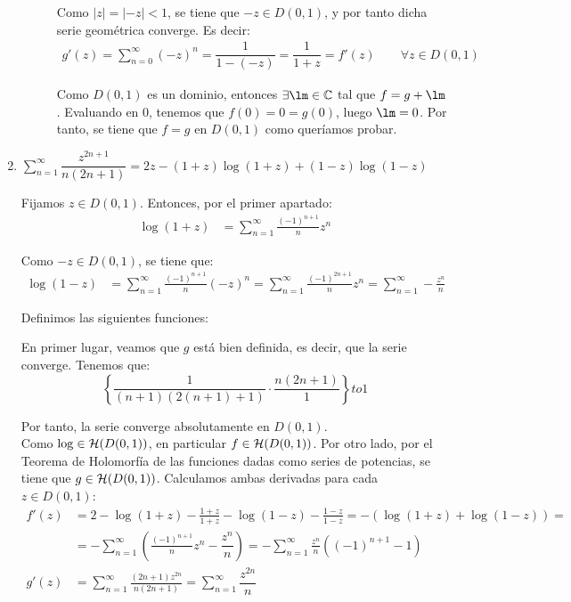 \begin{ejercicio}
\begin{enumerate}
\begin{description}
            Como $|z|=|-z|<1$, se tiene que $-z\in D(0,1)$, y por tanto dicha serie geométrica converge. Es decir:
            \begin{align*}
                g'(z) = \sum_{n=0}^\infty (-z)^{n}
                = \dfrac{1}{1-(-z)} = \dfrac{1}{1+z} = f'(z)\qquad \forall z\in D(0,1)
            \end{align*}

            Como $D(0,1)$ es un dominio, entonces $\exists \lm\in \bb{C}$ tal que $f=g+\lm$. Evaluando en $0$, tenemos que $f(0)=0=g(0)$, luego $\lm=0$. Por tanto, se tiene que $f=g$ en $D(0,1)$ como queríamos probar.
        \end{description}
        \item $\sum\limits_{n= 1}^\infty \dfrac{z^{2n+1}}{n(2n+1)} = 2z - (1+z)\log(1+z) + (1-z)\log(1-z)$
            
        Fijamos $z\in D(0,1)$. Entonces, por el primer apartado:
        \begin{align*}
            \log(1+z) &= \sum_{n=1}^\infty \frac{(-1)^{n+1}}{n}z^n
        \end{align*}

        Como $-z\in D(0,1)$, se tiene que:
        \begin{align*}
            \log(1-z) &= \sum_{n=1}^\infty \frac{(-1)^{n+1}}{n}(-z)^n = \sum_{n=1}^\infty \frac{(-1)^{2n+1}}{n}z^n
            = \sum_{n=1}^\infty -\frac{z^n}{n}
        \end{align*}

        Definimos las siguientes funciones:

        En primer lugar, veamos que $g$ está bien definida, es decir, que la serie converge. Tenemos que:
        \begin{equation*}
            \left\{\dfrac{1}{(n+1)(2(n+1)+1)}\cdot \dfrac{n(2n+1)}{1}\right\}to 1
        \end{equation*}

        Por tanto, la serie converge absolutamente en $D(0,1)$.\\

        Como $\log\in \mathcal{H}(D(0,1))$, en particular $f\in \mathcal{H}(D(0,1))$. Por otro lado, por el Teorema de Holomorfía de las funciones dadas como series de potencias, se tiene que $g\in \mathcal{H}(D(0,1))$. Calculamos ambas derivadas para cada $z\in D(0,1)$:
        \begin{align*}
            f'(z) &= 2 - \log(1+z) - \frac{1+z}{1+z} - \log(1-z) - \frac{1-z}{1-z} = -\left(\log(1+z) + \log(1-z)\right)
            =\\&= -\sum_{n=1}^\infty \left(\frac{(-1)^{n+1}}{n}z^n - \dfrac{z^n}{n}\right) = -\sum_{n=1}^\infty \frac{z^n}{n}\left((-1)^{n+1}-1\right)\\
            g'(z) &= \sum_{n=1}^\infty \frac{(2n+1)z^{2n}}{n(2n+1)} = \sum_{n=1}^\infty \dfrac{z^{2n}}{n}
        \end{align*}


\end{enumerate}
\end{ejercicio}
